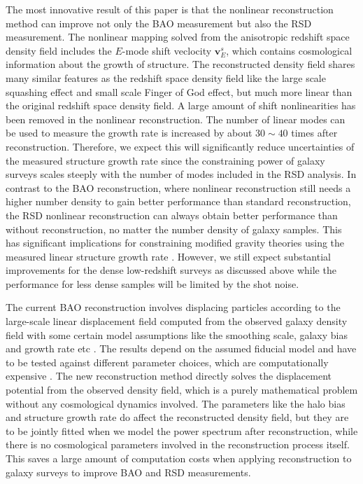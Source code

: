 \documentclass[aps,prx,twocolumn,superscriptaddress,groupedaddress,nofootinbib,amsfont]{revtex4}  %
\begin{document}
The most innovative result of this paper is that the nonlinear reconstruction
method can improve not only the BAO measurement but also the RSD measurement.
The nonlinear mapping solved from the anisotropic redshift space density field
includes the $E$-mode shift veclocity $\bm{v}^s_E$, which contains cosmological
information about the growth of structure. 
The reconstructed density field shares many similar features as the redshift 
space density field like the large scale squashing effect and small scale 
Finger of God effect, but much more linear than the original redshift space 
density field. A large amount of shift nonlinearities has been removed in the
nonlinear reconstruction. The number of linear modes can be used to measure the
growth rate is increased by about $30\sim40$ times after reconstruction. 
Therefore, we expect this will significantly reduce uncertainties of the 
measured structure growth rate since the constraining power of galaxy surveys
scales steeply with the number of modes included in the RSD analysis.
In contrast to the BAO reconstruction, where nonlinear reconstruction still 
needs a higher number density to gain better performance than standard 
reconstruction, the RSD nonlinear reconstruction can always obtain better 
performance than without reconstruction, no matter the number density of galaxy 
samples. This has significant implications for constraining modified gravity
theories using the measured linear structure growth rate \cite{2017Yu1}.
However, we still expect substantial improvements for the dense low-redshift 
surveys as discussed above while the performance for less dense samples
will be limited by the shot noise. 

The current BAO reconstruction involves displacing particles according to the 
large-scale linear displacement field computed from the observed galaxy density
field with some certain model assumptions like the smoothing scale, galaxy bias
and growth rate etc \cite{2007bao}. The results depend on the assumed fiducial
model and have to be tested against different parameter choices, which are 
computationally expensive \cite{2012nikhil}.
The new reconstruction method directly solves the displacement potential from 
the observed density field, which is a purely mathematical problem without any
cosmological dynamics involved.
The parameters like the halo bias and structure growth rate do affect the 
reconstructed density field, but they are to be jointly fitted when we model 
the power spectrum after reconstruction, while there is no cosmological 
parameters involved in the reconstruction process itself.
This saves a large amount of computation costs when applying reconstruction to 
galaxy surveys to improve BAO and RSD measurements.
\end{document}
